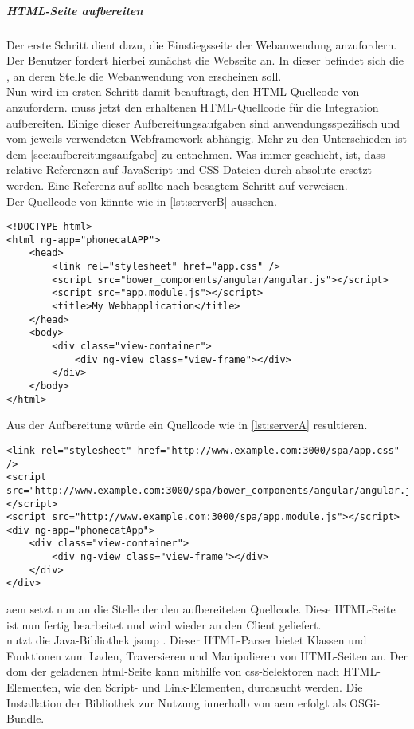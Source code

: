 \subparagraph{HTML-Seite aufbereiten}
\label{sec:html-seite-aufbereiten}
Der erste Schritt dient dazu, die Einstiegsseite der Webanwendung anzufordern. \\
Der Benutzer fordert hierbei zunächst die Webseite \serverA an. In dieser befindet sich die \ajc, an deren Stelle die Webanwendung von \serverB erscheinen soll.\\
Nun wird im ersten Schritt  damit beauftragt, den HTML-Quellcode von \serverB anzufordern.  muss jetzt den erhaltenen HTML-Quellcode für die Integration aufbereiten. Einige dieser Aufbereitungsaufgaben sind anwendungsspezifisch und vom jeweils verwendeten Webframework abhängig. Mehr zu den Unterschieden ist dem \autoref{sec:aufbereitungsaufgabe} zu entnehmen. Was immer geschieht, ist, dass relative Referenzen auf JavaScript und CSS-Dateien durch absolute ersetzt werden. Eine Referenz auf  sollte nach besagtem Schritt auf  verweisen.\\
Der Quellcode von  könnte wie in \autoref{lst:serverB} aussehen.

\begin{lstlisting}[style=htmlcssjs, caption=Ausgangssituation auf Server B, label=lst:serverB]
<!DOCTYPE html>
<html ng-app="phonecatAPP">
	<head>
		<link rel="stylesheet" href="app.css" />
		<script src="bower_components/angular/angular.js"></script>
		<script src="app.module.js"></script>
		<title>My Webbapplication</title>
	</head>
	<body>
		<div class="view-container">
			<div ng-view class="view-frame"></div>
		</div>
	</body>
</html>
\end{lstlisting}

Aus der Aufbereitung würde ein Quellcode wie in \autoref{lst:serverA} resultieren.

\begin{lstlisting}[style=htmlcssjs, caption=Aufbereiteter Quellcode, label=lst:serverA]
<link rel="stylesheet" href="http://www.example.com:3000/spa/app.css" />
<script src="http://www.example.com:3000/spa/bower_components/angular/angular.js"></script>
<script src="http://www.example.com:3000/spa/app.module.js"></script>
<div ng-app="phonecatApp">
	<div class="view-container">
		<div ng-view class="view-frame"></div>
	</div>
</div>

\end{lstlisting}

\ac{aem} setzt nun an die Stelle der \ajc den aufbereiteten Quellcode. Diese HTML-Seite ist nun fertig bearbeitet und wird wieder an den Client geliefert. \\
 nutzt die Java-Bibliothek jsoup \cite{Hedley2016}. Dieser HTML-Parser bietet Klassen und Funktionen zum Laden, Traversieren und Manipulieren von HTML-Seiten an. Der \ac{dom} der geladenen \ac{html}-Seite kann mithilfe von \ac{css}-Selektoren nach HTML-Elementen, wie den Script- und Link-Elementen, durchsucht werden. Die Installation der Bibliothek zur Nutzung innerhalb von \ac{aem} erfolgt als OSGi-Bundle.
